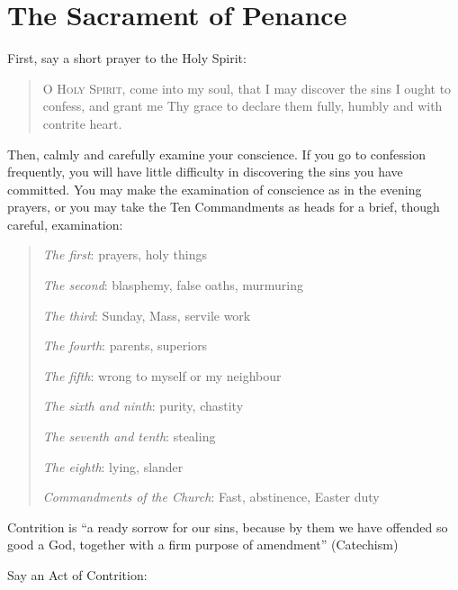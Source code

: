 \def\tabmark{Penance}

\chapter{The Sacrament of Penance}


First, say a short prayer to the Holy Spirit:

\begin{quote}
\lettrine{O}{ Holy Spirit,} come into my soul, that I may discover the sins I ought to confess, and grant me Thy grace to declare them fully, humbly and with contrite heart.
\end{quote}

Then, calmly and carefully examine your conscience. If you go to confession frequently, you will have little difficulty in discovering the sins you have committed. You may make the examination of conscience as in the evening prayers, or you may take the Ten Commandments as heads for a brief, though careful, examination:

\smallskip


\begin{quote}
\emph{The first}: prayers, holy things

\emph{The second}: blasphemy, false oaths, murmuring

\emph{The third}: Sunday, Mass, servile work

\emph{The fourth}: parents, superiors

\emph{The fifth}: wrong to myself or my neighbour

\emph{The sixth and ninth}: purity, chastity

\emph{The seventh and tenth}: stealing

\emph{The eighth}: lying, slander

\emph{Commandments of the Church}: Fast, abstinence, Easter duty

\end{quote}


Contrition is ``a ready sorrow for our sins, because by them we have offended so good a God, together with a firm purpose of amendment'' (Catechism)

Say an Act of Contrition:

